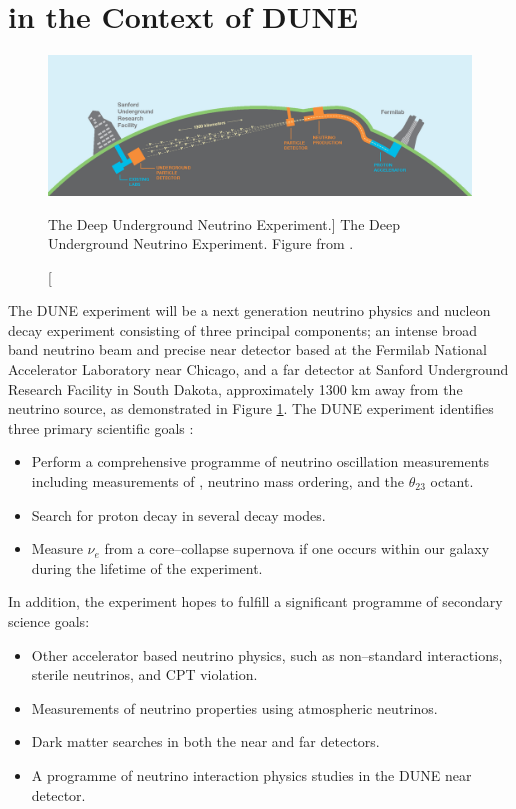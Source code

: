 \section{\protodune{} in the Context of DUNE} \label{sec:pdsp_dune}

\begin{figure}

	\centering

	\includegraphics[width=\textwidth]{figures/dune_baseline.png}

	\caption
	[The Deep Underground Neutrino Experiment.]
	{The Deep Underground Neutrino Experiment. Figure from \cite{Abi:2020wmh}.}

	\label{fig:dune_baseline}

\end{figure}

The DUNE experiment will be a next generation neutrino physics and nucleon decay
experiment consisting of three principal components; an intense broad band 
neutrino beam and precise near detector based at the Fermilab National 
Accelerator Laboratory near Chicago, and a far detector at Sanford Underground 
Research Facility in South Dakota, approximately 1300 km away from the 
neutrino source, as demonstrated in Figure \ref{fig:dune_baseline}. The DUNE 
experiment identifies three primary scientific goals 
\cite{Abi:2020evt}:
\begin{itemize}
	\item Perform a comprehensive programme of neutrino oscillation measurements
		including measurements of \dcp{}, neutrino mass ordering, and the
		$\theta_{23}$ octant.
	\item Search for proton decay in several decay modes.
	\item Measure $\nu_e$ from a core--collapse supernova if one occurs within our
		galaxy during the lifetime of the experiment.
\end{itemize}
In addition, the experiment hopes to fulfill a significant programme of
secondary science goals:
\begin{itemize}
	\item Other accelerator based neutrino physics, such as non--standard
		interactions, sterile neutrinos, and CPT violation.
	\item Measurements of neutrino properties using atmospheric neutrinos.
	\item Dark matter searches in both the near and far detectors.
	\item A programme of neutrino interaction physics studies in the DUNE near
		detector.
\end{itemize}

